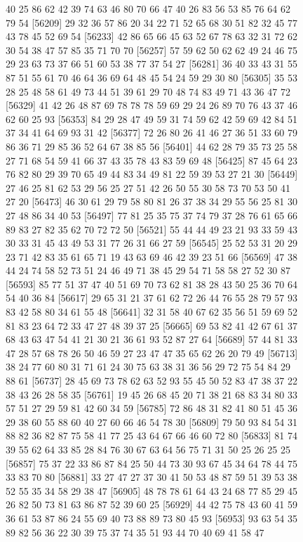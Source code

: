 \documentclass{article}
\begin{document}
\begin{figure}[H]
\begin{Schunk}
\begin{Soutput}
[56185] 40 25 86 62 42 39 74 63 46 80 70 66 47 40 26 83 56 53 85 76 64 62 79 54
[56209] 29 32 36 57 86 20 34 22 71 52 65 68 30 51 82 32 45 77 43 78 45 52 69 54
[56233] 42 86 65 66 45 63 52 67 78 63 32 31 72 62 30 54 38 47 57 85 35 71 70 70
[56257] 57 59 62 50 62 62 49 24 46 75 29 23 63 73 37 66 51 60 53 38 77 37 54 27
[56281] 36 40 33 43 31 55 87 51 55 61 70 46 64 36 69 64 48 45 54 24 59 29 30 80
[56305] 35 53 28 25 48 58 61 49 73 44 51 39 61 29 70 48 74 83 49 71 43 36 47 72
[56329] 41 42 26 48 87 69 78 78 78 59 69 29 24 26 89 70 76 43 37 46 62 60 25 93
[56353] 84 29 28 47 49 59 31 74 59 62 42 59 69 42 84 51 37 34 41 64 69 93 31 42
[56377] 72 26 80 26 41 46 27 36 51 33 60 79 86 36 71 29 85 36 52 64 67 38 85 56
[56401] 44 62 28 79 35 73 25 58 27 71 68 54 59 41 66 37 43 35 78 43 83 59 69 48
[56425] 87 45 64 23 76 82 80 29 39 70 65 49 44 83 34 49 81 22 59 39 53 27 21 30
[56449] 27 46 25 81 62 53 29 56 25 27 51 42 26 50 55 30 58 73 70 53 50 41 27 20
[56473] 46 30 61 29 79 58 80 81 26 37 38 34 29 55 56 25 81 30 27 48 86 34 40 53
[56497] 77 81 25 35 75 37 74 79 37 28 76 61 65 66 89 83 27 82 35 62 70 72 72 50
[56521] 55 44 44 49 23 21 93 33 59 43 30 33 31 45 43 49 53 31 77 26 31 66 27 59
[56545] 25 52 53 31 20 29 23 71 42 83 35 61 65 71 19 43 63 69 46 42 39 23 51 66
[56569] 47 38 44 24 74 58 52 73 51 24 46 49 71 38 45 29 54 71 58 58 27 52 30 87
[56593] 85 77 51 37 47 40 51 69 70 73 62 81 38 28 43 50 25 36 70 64 54 40 36 84
[56617] 29 65 31 21 37 61 62 72 26 44 76 55 28 79 57 93 83 42 58 80 34 61 55 48
[56641] 32 31 58 40 67 62 35 56 51 59 69 52 81 83 23 64 72 33 47 27 48 39 37 25
[56665] 69 53 82 41 42 67 61 37 68 43 63 47 54 41 21 30 21 36 61 93 52 87 27 64
[56689] 57 44 81 33 47 28 57 68 78 26 50 46 59 27 23 47 47 35 65 62 26 20 79 49
[56713] 38 24 77 60 80 31 71 61 24 30 75 63 38 31 36 56 29 72 75 54 84 29 88 61
[56737] 28 45 69 73 78 62 63 52 93 55 45 50 52 83 47 38 37 22 38 43 26 28 58 35
[56761] 19 45 26 68 45 20 71 38 21 68 83 34 80 33 57 51 27 29 59 81 42 60 34 59
[56785] 72 86 48 31 82 41 80 51 45 36 29 38 60 55 88 60 40 27 60 66 46 54 78 30
[56809] 79 50 93 84 54 31 88 82 36 82 87 75 58 41 77 25 43 64 67 66 46 60 72 80
[56833] 81 74 39 55 62 64 33 85 28 84 76 30 67 63 64 56 75 71 31 50 25 26 25 25
[56857] 75 37 22 33 86 87 84 25 50 44 73 30 93 67 45 34 64 78 44 75 33 83 70 80
[56881] 33 27 47 27 37 30 41 50 53 48 87 59 51 39 53 38 52 55 35 34 58 29 38 47
[56905] 48 78 78 61 64 43 24 68 77 85 29 45 26 82 50 73 81 63 86 87 52 39 60 25
[56929] 44 42 75 78 43 60 41 59 36 61 53 87 86 24 55 69 40 73 88 89 73 80 45 93
[56953] 93 63 54 35 89 82 56 36 22 30 39 75 37 74 35 51 93 44 70 40 69 41 58 47

\end{Soutput}
\end{Schunk}
\end{figure}
\end{document}
